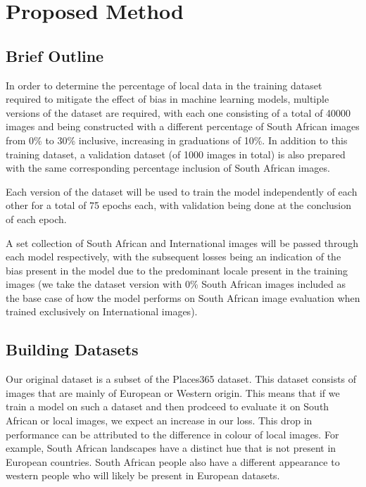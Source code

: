 \documentclass[conference]{IEEEtran}
\begin{document}
\section{Proposed Method}

%
%
%
%
%
%

\subsection{Brief Outline}

In order to determine the percentage of local data in the training dataset required to mitigate the effect of bias in machine learning models, multiple versions of the dataset are required, with each one consisting of a total of 40000 images and being constructed with a different percentage of South African images from 0\% to 30\% inclusive, increasing in graduations of 10\%. In addition to this training dataset, a validation dataset (of 1000 images in total) is also prepared with the same corresponding percentage inclusion of South African images.

Each version of the dataset will be used to train the model independently of each other for a total of 75 epochs each, with validation being done at the conclusion of each epoch. 

A set collection of South African and International images will be passed through each model respectively, with the subsequent losses being an indication of the bias present in the model due to the predominant locale present in the training images (we take the dataset version with 0\% South African images included as the base case of how the model performs on South African image evaluation when trained exclusively on International images).

\subsection{Building Datasets}

Our original dataset is a subset of the Places365 dataset. This dataset consists of images that are mainly of European or Western origin. This means that if we train a model on such a dataset and then prodceed to evaluate it on South African or local images, we expect an increase in our loss. This drop in performance can be attributed to the difference in colour of local images. For example, South African landscapes have a distinct hue that is not present in European countries. South African people also have a different appearance to western people who will likely be present in European datasets.
\end{document}
